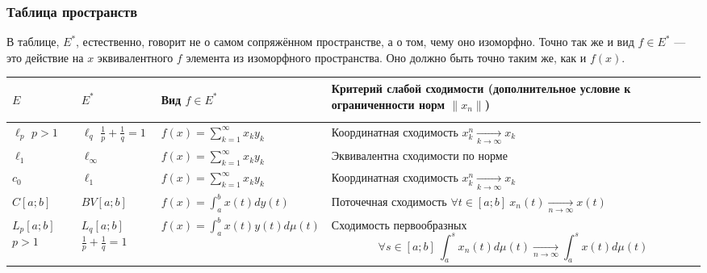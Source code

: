 \subsubsection*{Таблица пространств}

\begin{anote}
	В таблице, $E^*$, естественно, говорит не о самом сопряжённом пространстве, а о том, чему оно изоморфно. Точно так же и вид $f \in E^*$ --- это действие на $x$ эквивалентного $f$ элемента из изоморфного пространства. Оно должно быть точно таким же, как и $f(x)$.
\end{anote}

\begin{center}
\begin{tabular}{ | p{1.5cm} | p{2cm} | p{4.2cm} | p{7.8cm} | }
	\hline
	\begin{center}$E$\end{center} & \begin{center}$E^*$\end{center} & \begin{center}Вид $f \in E^*$\end{center} & Критерий слабой сходимости (дополнительное условие к ограниченности норм $\|x_n\|$) \\
	\hline
	$\ell_p$ \newline $p > 1$ & $\ell_q$ \newline $\frac{1}{p} + \frac{1}{q} = 1$ & \vspace{0.025ex}\hspace{2.5ex}$f(x) = \sum_{k = 1}^\infty x_ky_k$ & Координатная сходимость \newline $x_k^n \xrightarrow[k \to \infty]{} x_k$ \\
	\hline
	$\ell_1$ & $\ell_\infty$ & \hspace{2.5ex}$f(x) = \sum_{k = 1}^\infty x_ky_k$ & Эквивалентна сходимости по норме \\
	\hline
	$c_0$ & $\ell_1$ & \vspace{0.025ex}\hspace{2.5ex}$f(x) = \sum_{k = 1}^\infty x_ky_k$ & Координатная сходимость \newline $x_k^n \xrightarrow[k \to \infty]{} x_k$ \\
	\hline
	$C[a; b]$ & $BV[a; b]$ & \hspace{2.1ex}$f(x) = \int_a^b x(t)dy(t)$ & Поточечная сходимость \newline $\forall t \in [a; b]\ x_n(t) \xrightarrow[n \to \infty]{} x(t)$ \\
	\hline
	$L_p[a; b]$ \newline $p > 1$ & $L_q[a; b]$ \newline $\frac{1}{p} + \frac{1}{q} = 1$ & \vspace{2.5ex}$f(x) = \int_a^b x(t)y(t)d\mu(t)$ & Сходимость первообразных \newline \[\forall s \in [a; b]\ \int_a^s x_n(t)d\mu(t) \xrightarrow[n \to \infty]{} \int_a^s x(t)d\mu(t)\] \\
	\hline
\end{tabular}
\end{center}

